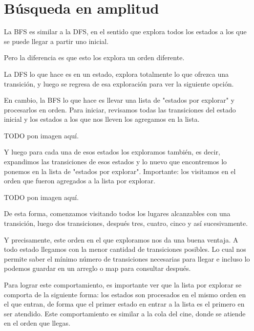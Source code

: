 \chapter*{Búsqueda en amplitud}

La BFS es similar a la DFS, en el sentido que explora todos los estados a los que se puede llegar a partir uno inicial.

Pero la diferencia es que esto los explora un orden diferente.

La DFS lo que hace es en un estado, explora totalmente lo que ofrezca una transición, y luego se regresa de esa exploración para ver la siguiente opción.

En cambio, la BFS lo que hace es llevar una lista de "estados por explorar" y procesarlos en orden. Para iniciar, revisamos todas las transiciones del estado inicial y los estados a los que nos lleven los agregamos en la lista.

\begin{center}
	TODO pon imagen aquí.
\end{center}

Y luego para cada una de esos estados los exploramos también, es decir, expandimos las transiciones de esos estados y lo nuevo que encontremos lo ponemos en la lista de "estados por explorar". Importante: los visitamos en el orden que fueron agregados a la lista por explorar.

\begin{center}
	TODO pon imagen aquí.
\end{center}

De esta forma, comenzamos visitando todos los lugares alcanzables con una transición, luego dos transiciones, después tres, cuatro, cinco y  así sucesivamente.

Y precisamente, este orden en el que exploramos nos da una buena ventaja. A todo estado llegamos con la menor cantidad de transiciones posibles. Lo cual nos permite saber el mínimo número de transiciones necesarias para llegar e incluso lo podemos guardar en un arreglo o map para consultar después.

Para lograr este comportamiento, es importante ver que la lista por explorar se comporta de la siguiente forma: los estados son procesados en el mismo orden en el que entran, de forma que el primer estado en entrar a la lista es el primero en ser atendido. Este comportamiento es similar a la cola del cine, donde se atiende en el orden que llegas.


